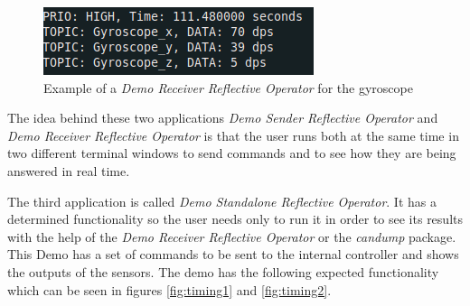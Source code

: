 \documentclass[12pt]{report}%
\begin{document}
\begin{figure}[ht]
 \centering
 \includegraphics[]{receiver_example}
		\caption{Example of a \textit{Demo Receiver Reflective Operator} for the gyroscope}
		\label{fig:receiver1}
\end{figure}

The idea behind these two applications \textit{Demo Sender Reflective Operator} and \textit{Demo Receiver Reflective Operator} is that the user runs both at the same time in two different terminal windows to send commands and to see how they are being answered in real time.

The third application is called \textit{Demo Standalone Reflective Operator}. It has a determined functionality so the user needs only to run it in order to see its results with the help of the \textit{Demo Receiver Reflective Operator} or the \textit{candump} package. This Demo has a set of commands to be sent to the internal controller and shows the outputs of the sensors. The demo has the following expected functionality which can be seen in figures \ref{fig:timing1} and \ref{fig:timing2}.
\end{document}
